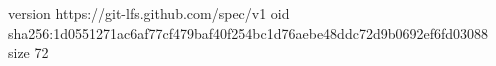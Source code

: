 version https://git-lfs.github.com/spec/v1
oid sha256:1d0551271ac6af77cf479baf40f254bc1d76aebe48ddc72d9b0692ef6fd03088
size 72
